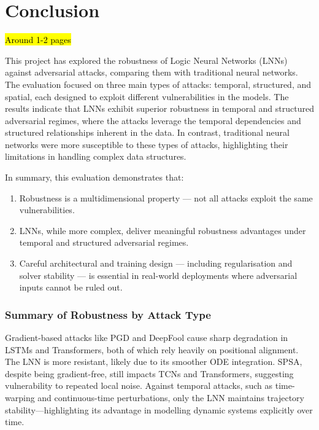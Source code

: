 \chapter{Conclusion}

\hl{Around 1-2 pages}

This project has explored the robustness of Logic Neural Networks (LNNs) against adversarial attacks, comparing them with traditional neural networks. The evaluation focused on three main types of attacks: temporal, structured, and spatial, each designed to exploit different vulnerabilities in the models.
The results indicate that LNNs exhibit superior robustness in temporal and structured adversarial regimes, where the attacks leverage the temporal dependencies and structured relationships inherent in the data. In contrast, traditional neural networks were more susceptible to these types of attacks, highlighting their limitations in handling complex data structures.


In summary, this evaluation demonstrates that:
\begin{enumerate}
    \item Robustness is a multidimensional property — not all attacks exploit the same vulnerabilities.
    \item LNNs, while more complex, deliver meaningful robustness advantages under temporal and structured adversarial regimes.
    \item Careful architectural and training design — including regularisation and solver stability — is essential in real-world deployments where adversarial inputs cannot be ruled out.
\end{enumerate}

\subsection*{Summary of Robustness by Attack Type}

Gradient-based attacks like PGD and DeepFool cause sharp degradation in LSTMs and Transformers, both of which rely heavily on positional alignment. The LNN is more resistant, likely due to its smoother ODE integration. SPSA, despite being gradient-free, still impacts TCNs and Transformers, suggesting vulnerability to repeated local noise. Against temporal attacks, such as time-warping and continuous-time perturbations, only the LNN maintains trajectory stability—highlighting its advantage in modelling dynamic systems explicitly over time.



